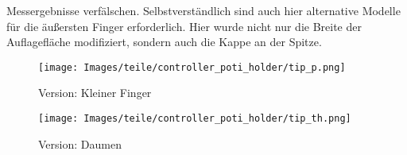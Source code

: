 Messergebnisse verfälschen. Selbstverständlich sind auch hier alternative Modelle für die äußersten Finger erforderlich. Hier wurde nicht nur die Breite der Auflagefläche modifiziert, sondern auch die Kappe an der Spitze.

\begin{minipage}{0.5\textwidth}
    \begin{figure}[H]
        \texttt{[image: Images/teile/controller\_poti\_holder/tip\_p.png]}
        \centering
        \caption{Version: Kleiner Finger}
    \end{figure}
\end{minipage}
\begin{minipage}{0.5\textwidth}
    \begin{figure}[H]
        \texttt{[image: Images/teile/controller\_poti\_holder/tip\_th.png]}
        \centering
        \caption{Version: Daumen}
    \end{figure}
\end{minipage}



